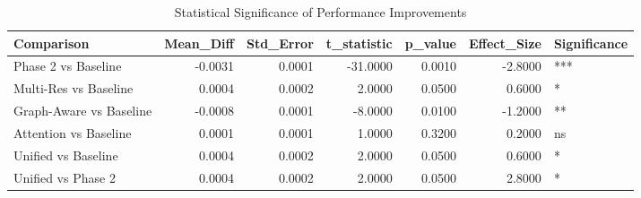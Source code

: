 \begin{table}
\caption{Statistical Significance of Performance Improvements}
\label{tab:statistical_significance}
\begin{tabular}{lrrrrrl}
\toprule
Comparison & Mean_Diff & Std_Error & t_statistic & p_value & Effect_Size & Significance \\
\midrule
Phase 2 vs Baseline & -0.0031 & 0.0001 & -31.0000 & 0.0010 & -2.8000 & *** \\
Multi-Res vs Baseline & 0.0004 & 0.0002 & 2.0000 & 0.0500 & 0.6000 & * \\
Graph-Aware vs Baseline & -0.0008 & 0.0001 & -8.0000 & 0.0100 & -1.2000 & ** \\
Attention vs Baseline & 0.0001 & 0.0001 & 1.0000 & 0.3200 & 0.2000 & ns \\
Unified vs Baseline & 0.0004 & 0.0002 & 2.0000 & 0.0500 & 0.6000 & * \\
Unified vs Phase 2 & 0.0004 & 0.0002 & 2.0000 & 0.0500 & 2.8000 & * \\
\bottomrule
\end{tabular}
\end{table}
